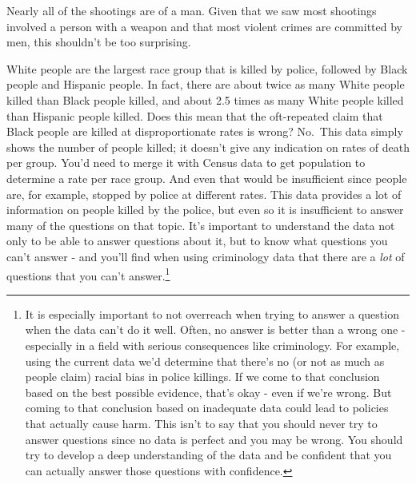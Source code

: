 \documentclass[
  12pt,
  openany]{book}
\newenvironment{Shaded}{\begin{snugshade}}{\end{snugshade}}
\newcommand{\AttributeTok}[1]{\textcolor[rgb]{0.61,0.61,0.61}{#1}}
\newcommand{\CommentTok}[1]{\textcolor[rgb]{0.37,0.37,0.37}{\textit{#1}}}
\newcommand{\DecValTok}[1]{\textcolor[rgb]{0.06,0.06,0.06}{#1}}
\newcommand{\FunctionTok}[1]{\textcolor[rgb]{0,0,0}{#1}}
\newcommand{\NormalTok}[1]{#1}
\newcommand{\OtherTok}[1]{\textcolor[rgb]{0.37,0.37,0.37}{#1}}
\newcommand{\SpecialCharTok}[1]{\textcolor[rgb]{0,0,0}{#1}}
\begin{document}
Nearly all of the shootings are of a man. Given that we saw most shootings involved a person with a weapon and that most violent crimes are committed by men, this shouldn't be too surprising.

\begin{Shaded}
\end{Shaded}

White people are the largest race group that is killed by police, followed by Black people and Hispanic people. In fact, there are about twice as many White people killed than Black people killed, and about 2.5 times as many White people killed than Hispanic people killed. Does this mean that the oft-repeated claim that Black people are killed at disproportionate rates is wrong? No.~This data simply shows the number of people killed; it doesn't give any indication on rates of death per group. You'd need to merge it with Census data to get population to determine a rate per race group. And even that would be insufficient since people are, for example, stopped by police at different rates. This data provides a lot of information on people killed by the police, but even so it is insufficient to answer many of the questions on that topic. It's important to understand the data not only to be able to answer questions about it, but to know what questions you can't answer - and you'll find when using criminology data that there are a \emph{lot} of questions that you can't answer.\footnote{It is especially important to not overreach when trying to answer a question when the data can't do it well. Often, no answer is better than a wrong one - especially in a field with serious consequences like criminology. For example, using the current data we'd determine that there's no (or not as much as people claim) racial bias in police killings. If we come to that conclusion based on the best possible evidence, that's okay - even if we're wrong. But coming to that conclusion based on inadequate data could lead to policies that actually cause harm. This isn't to say that you should never try to answer questions since no data is perfect and you may be wrong. You should try to develop a deep understanding of the data and be confident that you can actually answer those questions with confidence.}
\end{document}
